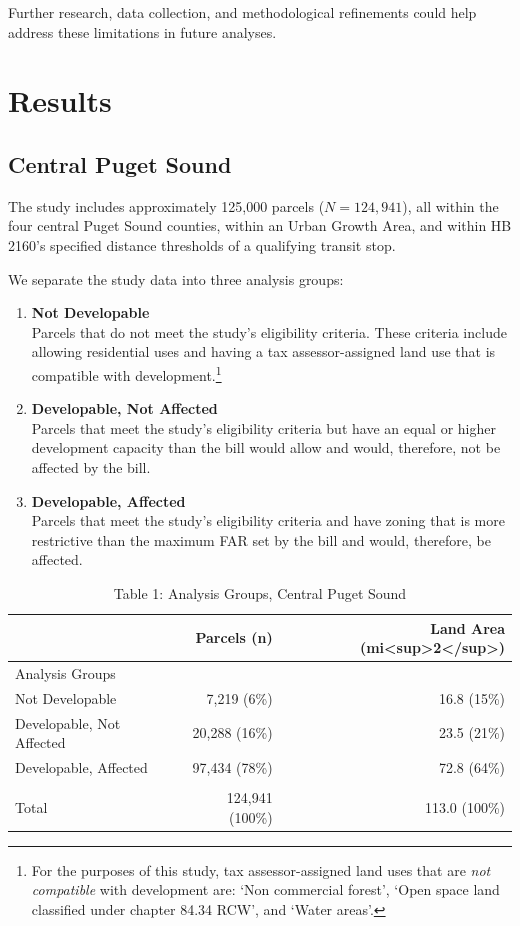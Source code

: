 \documentclass[
]{agujournal2019}
\begin{document}
Further research, data collection, and methodological refinements could
help address these limitations in future analyses.

\section{Results}\label{results}

\subsection{Central Puget Sound}\label{central-puget-sound}

The study includes approximately 125,000 parcels (\(N = 124,941\)), all
within the four central Puget Sound counties, within an Urban Growth
Area, and within HB 2160's specified distance thresholds of a qualifying
transit stop.

We separate the study data into three analysis groups:

\begin{enumerate}
\def\labelenumi{\arabic{enumi}.}
\item
  \textbf{Not Developable}\\
  Parcels that do not meet the study's eligibility criteria. These
  criteria include allowing residential uses and having a tax
  assessor-assigned land use that is compatible with
  development.\footnote{For the purposes of this study, tax
    assessor-assigned land uses that are \emph{not compatible} with
    development are: `Non commercial forest', `Open space land
    classified under chapter 84.34 RCW', and `Water areas'.}
\item
  \textbf{Developable, Not Affected}\\
  Parcels that meet the study's eligibility criteria but have an equal
  or higher development capacity than the bill would allow and would,
  therefore, not be affected by the bill.
\item
  \textbf{Developable, Affected}\\
  Parcels that meet the study's eligibility criteria and have zoning
  that is more restrictive than the maximum FAR set by the bill and
  would, therefore, be affected.
\end{enumerate}

\begin{longtable}{l|rr}
\caption{Table 1: Analysis Groups, Central Puget Sound}\tabularnewline

\toprule
\multicolumn{1}{l}{} & Parcels (n) & Land Area (mi<sup>2</sup>) \\ 
\midrule
\multicolumn{3}{l}{Analysis Groups} \\ 
\midrule
Not Developable & 7,219   (6\%) & 16.8  (15\%) \\ 
Developable, Not Affected & 20,288  (16\%) & 23.5  (21\%) \\ 
Developable, Affected & 97,434  (78\%) & 72.8  (64\%) \\ 
\midrule
\multicolumn{3}{l}{\vspace*{-5mm}} \\ 
Total & 124,941 (100\%) & 113.0 (100\%) \\ 
\bottomrule
\end{longtable}
\end{document}
